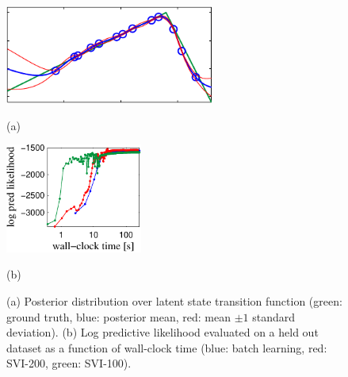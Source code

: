 \documentclass{article} %
\begin{document}
\begin{figure}[t]
\begin{center}
\begin{minipage}{0.54\textwidth}
    \begin{center}
    \hspace{-10mm}
        \includegraphics[width=6.9cm]{1dpaper4.pdf} 
        
        \hspace{10mm} (a)
    \end{center}
\end{minipage}
\begin{minipage}{0.4\textwidth}
    \begin{center}
        \includegraphics[width=4.5cm]{loglik.pdf}  
        
        \hspace{10mm} (b)
    \end{center}
\end{minipage}
\end{center}
\vspace{-3mm}
\caption{(a) Posterior distribution over latent state transition function (green: ground truth, blue: posterior mean, red: mean $\pm 1$ standard deviation). (b) Log predictive likelihood evaluated on a held out dataset as a function of wall-clock time (blue: batch learning, red: SVI-200, green: SVI-100).}
\label{fig:1d}
\end{figure}


\end{document}
